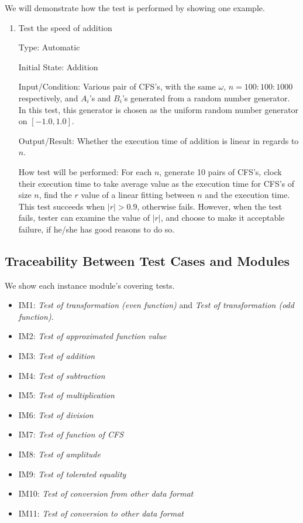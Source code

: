 \documentclass[12pt, titlepage]{article}
\begin{document}
We will demonstrate how the test is performed by showing one example.
\begin{enumerate}
	
	\item{Test the speed of addition\\}
	
	Type: Automatic
	
	Initial State: Addition
	
	Input/Condition: Various pair of CFS's, with the same $\omega$, $n=100:100:1000$ respectively, and $A_i$'s and $B_i$'s generated from a random number generator. In this test, this generator is chosen as the uniform random number generator on $[-1.0, 1.0]$. 
	
	Output/Result: Whether the execution time of addition is linear in regards to $n$.
	
	How test will be performed: For each $n$, generate 10 pairs of CFS's, clock their execution time to take average value as the execution time for CFS's of size $n$, find the $r$ value of a linear fitting between $n$ and the execution time. This test succeeds when $|r|>0.9$, otherwise fails. However, when the test fails, tester can examine the value of $|r|$, and choose to make it acceptable failure, if he/she has good reasons to do so. 
	
\end{enumerate}

\subsection{Traceability Between Test Cases and Modules}
We show each instance module's covering tests.

\begin{itemize}
	\item IM1: \textit{Test of transformation (even function)} and \textit{Test of transformation (odd function)}.
	\item IM2: \textit{Test of approximated function value}
	\item IM3: \textit{Test of addition}
	\item IM4: \textit{Test of subtraction}
	\item IM5: \textit{Test of multiplication}
	\item IM6: \textit{Test of division}
	\item IM7: \textit{Test of function of CFS}
	\item IM8: \textit{Test of amplitude}
	\item IM9: \textit{Test of tolerated equality}
	\item IM10: \textit{Test of conversion from other data format}
	\item IM11: \textit{Test of conversion to other data format}
\end{itemize}
				



\end{document}
